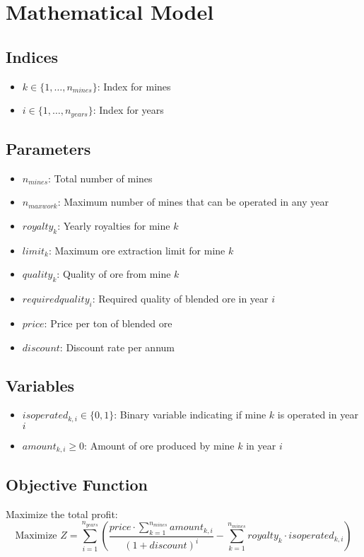\documentclass{article}
\begin{document}
\section*{Mathematical Model}

\subsection*{Indices}
\begin{itemize}
    \item $k \in \{1, \ldots, n_{mines}\}$: Index for mines
    \item $i \in \{1, \ldots, n_{years}\}$: Index for years
\end{itemize}

\subsection*{Parameters}
\begin{itemize}
    \item $n_{mines}$: Total number of mines
    \item $n_{maxwork}$: Maximum number of mines that can be operated in any year
    \item $royalty_k$: Yearly royalties for mine $k$
    \item $limit_k$: Maximum ore extraction limit for mine $k$
    \item $quality_k$: Quality of ore from mine $k$
    \item $requiredquality_i$: Required quality of blended ore in year $i$
    \item $price$: Price per ton of blended ore
    \item $discount$: Discount rate per annum
\end{itemize}

\subsection*{Variables}
\begin{itemize}
    \item $isoperated_{k,i} \in \{0, 1\}$: Binary variable indicating if mine $k$ is operated in year $i$
    \item $amount_{k,i} \geq 0$: Amount of ore produced by mine $k$ in year $i$
\end{itemize}

\subsection*{Objective Function}
Maximize the total profit:
\[
\text{Maximize } Z = \sum_{i=1}^{n_{years}} \left( \frac{price \cdot \sum_{k=1}^{n_{mines}} amount_{k,i}}{(1 + discount)^i} - \sum_{k=1}^{n_{mines}} royalty_k \cdot isoperated_{k,i} \right)
\]
\end{document}
